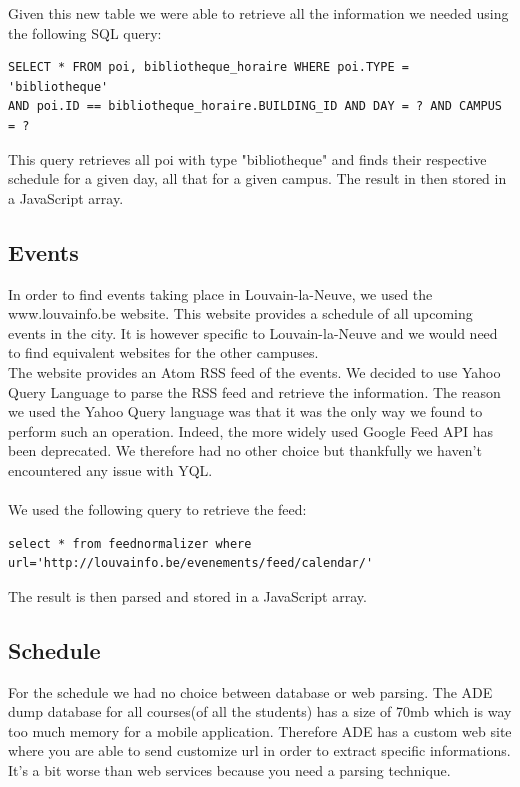 \documentclass[11pt, a4paper]{report}
\begin{document}
Given this new table we were able to retrieve all the information we needed using the following SQL query:
\begin{verbatim}
SELECT * FROM poi, bibliotheque_horaire WHERE poi.TYPE = 'bibliotheque' 
AND poi.ID == bibliotheque_horaire.BUILDING_ID AND DAY = ? AND CAMPUS = ?
\end{verbatim}

This query retrieves all poi with type "bibliotheque" and finds their respective schedule for a given day, all that for a given campus. The result in then stored in a JavaScript array.

\subsection{Events}

In order to find events taking place in Louvain-la-Neuve, we used the www.louvainfo.be website. This website provides a schedule of all upcoming events in the city. It is however specific to Louvain-la-Neuve and we would need to find equivalent websites for the other campuses. \\ The website provides an Atom RSS feed of the events. We decided to use Yahoo Query Language to parse the RSS feed and retrieve the information. The reason we used the Yahoo Query language was that it was the only way we found to perform such an operation. Indeed, the more widely used Google Feed API has been deprecated. We therefore had no other choice but thankfully we haven't encountered any issue with YQL.\\
\\We used the following query to retrieve the feed:
\begin{verbatim}
select * from feednormalizer where url='http://louvainfo.be/evenements/feed/calendar/'
\end{verbatim}
The result is then parsed and stored in a JavaScript array. 


\subsection{Schedule}
For the schedule we had no choice between database or web parsing. The ADE dump database for all courses(of all the students) has a size of 70mb which is way too much memory for a mobile application. Therefore ADE has a custom web site where you are able to send customize url in order to extract specific informations. It's a bit worse than web services because you need a parsing technique.
\end{document}
